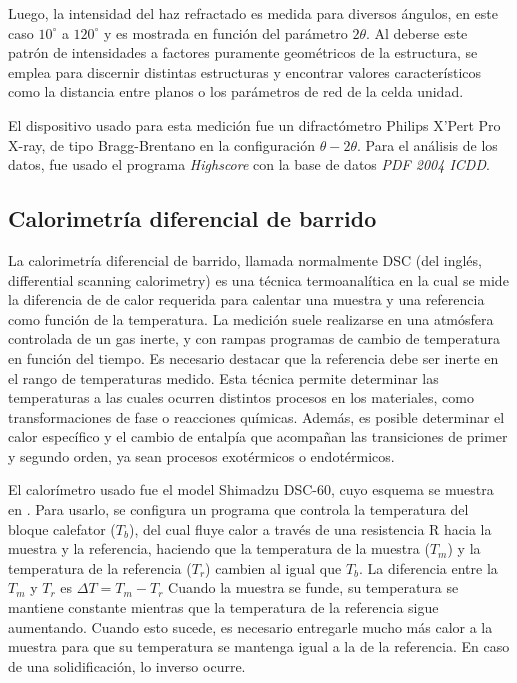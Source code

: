 \documentclass{article}
\theoremstyle{definition}
\theoremstyle{remark}
\begin{document}
 
 Luego, la intensidad del haz refractado es medida para diversos ángulos, en este caso $10^{\circ}$ a $120^{\circ}$ y es mostrada en función del parámetro $2\theta$. Al deberse este patrón de intensidades  a factores puramente geométricos de la estructura, se emplea para discernir distintas estructuras y encontrar valores característicos como la distancia entre planos o los parámetros de red de la celda unidad.

 El dispositivo usado para esta medición fue un difractómetro Philips X'Pert Pro X-ray, de tipo Bragg-Brentano en la configuración $\theta - 2\theta$.  Para el análisis de los datos, fue usado el programa \textit{Highscore} con la base de datos \textit{PDF 2004 ICDD}.
 
\subsection{Calorimetría diferencial de barrido}
La calorimetría diferencial de barrido, llamada normalmente DSC (del inglés, differential scanning calorimetry) es una técnica termoanalítica en la cual se mide la diferencia de de calor requerida para calentar una muestra y una referencia como función de la temperatura. La medición suele realizarse en una atmósfera controlada de un gas inerte, y con rampas programas de cambio de temperatura en función del tiempo.  Es necesario destacar que la referencia debe ser inerte en el rango de temperaturas medido.
Esta técnica permite determinar las temperaturas a las cuales ocurren distintos procesos en los materiales, como transformaciones de fase o reacciones químicas. Además, es posible determinar el calor específico y el cambio de entalpía que acompañan las transiciones de primer y segundo orden, ya sean procesos exotérmicos o endotérmicos.

El calorímetro usado fue el model Shimadzu DSC-60, cuyo esquema se muestra en . Para usarlo, se configura un programa que controla la temperatura del bloque calefator ($T_b$), del cual fluye calor a través de una resistencia R hacia la muestra y la referencia, haciendo que la temperatura de la muestra ($T_m$) y la temperatura de la referencia ($T_r$) cambien al igual que $T_b$. La diferencia entre la $T_m$ y $T_r$ es $\Delta T = T_m - T_r$
Cuando la muestra se funde, su temperatura se mantiene constante mientras que la temperatura de la referencia sigue aumentando. Cuando esto sucede, es necesario entregarle mucho más calor a la muestra para que su temperatura se mantenga igual a la de la referencia. En caso de una solidificación, lo inverso ocurre.
\end{document}

